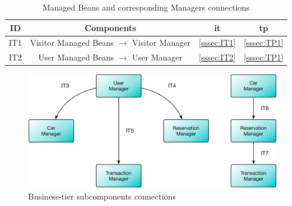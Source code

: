 \vspace{16pt}

\begin{table}[htbp]
\begin{center}
\begin{tabular}[t]{cccc}

\hline
\textbf{ID} & \textbf{Components} & \textbf{\acs{it}} & \textbf{\acs{tp}}\\
\hline
IT1 & \enspace Visitor Managed Beans $\rightarrow$ Visitor Manager \enspace & \ref{sssec:IT1} & \ref{sssec:TP1}\\
\hline
IT2 & \enspace User Managed Beans $\rightarrow$ User Manager \enspace & \ref{sssec:IT2} & 
\ref{sssec:TP1}\\
\hline

\end{tabular}
\caption{Managed Beans and corresponding Managers connections}
\end{center}
\end{table}

\clearpage

\vspace{120pt}
\begin{figure}[htbp]
\centering
\includegraphics[width=\textwidth]{Images/IT3-7.pdf}
\vspace{16pt}
\caption{Business-tier subcomponents connections}
\label{fig:it3-7}
\end{figure}

\vspace{16pt}

